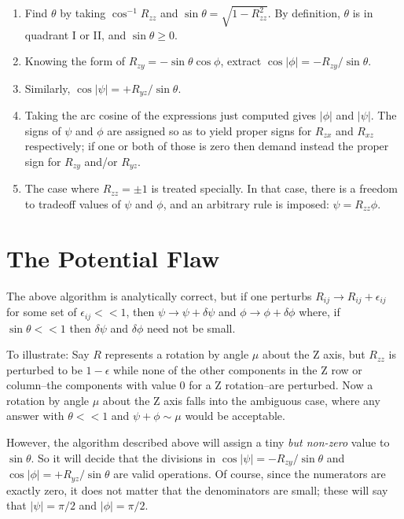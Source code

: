 \documentclass[twoside,12pt]{article}
\begin{document}
\begin{enumerate}
\item 
Find $\theta$ by taking $\cos^{-1} R_{zz}$ and  
$\sin \theta = \sqrt{1-R_{zz}^2}$.  By definition, 
$\theta$ is in quadrant I or II, and $\sin \theta \geq 0$.
\item 
Knowing the form of $R_{zy} = - \sin \theta \cos \phi$, extract 
$\cos | \phi | = - R_{zy} / \sin \theta$.  
\item
Similarly, 
$\cos | \psi | = + R_{yz} / \sin \theta$.
\item
Taking the arc cosine of the expressions just computed gives 
$|\phi|$ and $|\psi|$.  The signs of $\psi$ and $\phi$ 
are assigned so as to yield 
proper signs for $R_{zx}$ and $R_{xz}$ respectively; 
if one or both of those is zero then demand instead the proper sign for
$R_{zy}$ and/or $R_{yz}$. 
\item 
The case where $R_{zz} = \pm 1$ is treated specially.  In that case, there
is a freedom to tradeoff  values of $\psi$ and $\phi$, and an arbitrary rule is 
imposed:  $\psi = R_{zz} \phi$.
\end{enumerate}

\section{The Potential Flaw}

The above algorithm is analytically correct, but if one perturbs 
$R_{ij} \rightarrow R_{ij}+\epsilon_{ij}$ for some set of  
$\epsilon_{ij} << 1$, then $\psi \rightarrow \psi + \delta \psi$ and
$\phi \rightarrow \phi + \delta \phi$ where, if $\sin \theta << 1$
then $\delta \psi$ and $\delta \phi$ need not be small.

To illustrate:  Say $R$ represents a rotation by angle $\mu$ about the Z axis,
but $R_{zz}$ is perturbed to be $1 - \epsilon$ 
while none of the other components
in the Z row or column--the components with value 0 for a Z rotation--are 
perturbed.   Now a rotation by angle $\mu$ about the Z axis falls into the 
ambiguous case, where any answer with $\theta << 1$ and $\psi + \phi \sim \mu$
would be acceptable.  

However, the algorithm described above will assign
a tiny {\em but non-zero} value to $\sin \theta$.  So it will decide that the
divisions in $\cos | \psi | = - R_{zy} / \sin \theta$ and 
$\cos | \phi | = + R_{yz} / \sin \theta$ are valid operations.  
Of course, since the numerators are exactly zero, it does not matter that
the denominators are small; these will say that $ |\psi| = \pi /2$
and $ |\phi| = \pi /2$.  
\end{document}

